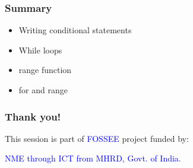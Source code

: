 \documentclass[14pt,compress]{beamer}
\begin{document}
\begin{frame}[fragile]
  \frametitle{Summary}
  \begin{block}{}
    \begin{itemize}
    \item Writing conditional statements
    \item While loops
    \item range function
    \item for and range
    \end{itemize}
  \end{block}    
\end{frame}

\begin{frame}
  \frametitle{Thank you!}  
  \begin{block}{}
  This session is part of \textcolor{blue}{FOSSEE} project funded by:
  \begin{center}
    \textcolor{blue}{NME through ICT from MHRD, Govt. of India}.
  \end{center}  
  \end{block}
\end{frame}
\end{document}
